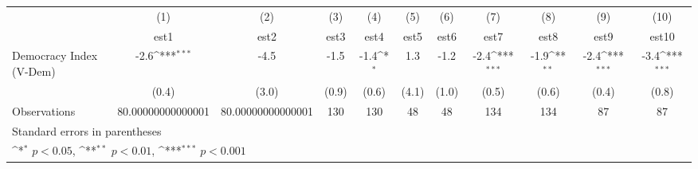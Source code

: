{
\def\sym#1{\ifmmode^{#1}\else\(^{#1}\)\fi}
\begin{tabular}{l*{10}{c}}
\hline\hline
                    &\multicolumn{1}{c}{(1)}         &\multicolumn{1}{c}{(2)}         &\multicolumn{1}{c}{(3)}         &\multicolumn{1}{c}{(4)}         &\multicolumn{1}{c}{(5)}         &\multicolumn{1}{c}{(6)}         &\multicolumn{1}{c}{(7)}         &\multicolumn{1}{c}{(8)}         &\multicolumn{1}{c}{(9)}         &\multicolumn{1}{c}{(10)}         \\
                    &        est1         &        est2         &        est3         &        est4         &        est5         &        est6         &        est7         &        est8         &        est9         &       est10         \\
\hline
Democracy Index (V-Dem)&        -2.6\sym{***}&        -4.5         &        -1.5         &        -1.4\sym{*}  &         1.3         &        -1.2         &        -2.4\sym{***}&        -1.9\sym{**} &        -2.4\sym{***}&        -3.4\sym{***}\\
                    &       (0.4)         &       (3.0)         &       (0.9)         &       (0.6)         &       (4.1)         &       (1.0)         &       (0.5)         &       (0.6)         &       (0.4)         &       (0.8)         \\
\hline
Observations        &80.00000000000001         &80.00000000000001         &         130         &         130         &          48         &          48         &         134         &         134         &          87         &          87         \\
\hline\hline
\multicolumn{11}{l}{\footnotesize Standard errors in parentheses}\\
\multicolumn{11}{l}{\footnotesize \sym{*} \(p<0.05\), \sym{**} \(p<0.01\), \sym{***} \(p<0.001\)}\\
\end{tabular}
}
